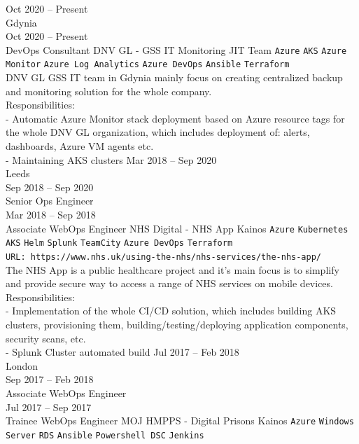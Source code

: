 \documentclass[9pt]{style/developercv}
\begin{document}
\begin{entrylist}
	\entry
    {Oct 2020 -- Present\\\footnotesize{Gdynia}
    \\Oct 2020 -- Present\\\footnotesize{DevOps Consultant}}
		{DNV GL - GSS IT Monitoring}
		{JIT Team}
		{
			\texttt{Azure}\slashsep
      \texttt{AKS}\slashsep
			\texttt{Azure Monitor}\slashsep
			\texttt{Azure Log Analytics}\slashsep
			\texttt{Azure DevOps}\slashsep
      \texttt{Ansible}\slashsep
      \texttt{Terraform}\\

      DNV GL GSS IT team in Gdynia mainly focus on creating centralized backup and monitoring solution for the whole company.\\
      Responsibilities:\\
      - Automatic Azure Monitor stack deployment based on Azure resource tags for the whole DNV GL organization, which includes deployment of: alerts, dashboards, Azure VM agents etc.\\
      - Maintaining AKS clusters
		}
	\entry
    {Mar 2018 -- Sep 2020\\\footnotesize{Leeds}
    \\Sep 2018 -- Sep 2020\\\footnotesize{Senior Ops Engineer}
    \\Mar 2018 -- Sep 2018\\\footnotesize{Associate WebOps Engineer}}
		{NHS Digital - NHS App}
		{Kainos}
		{
			\texttt{Azure}\slashsep
      \texttt{Kubernetes}\slashsep
      \texttt{AKS}\slashsep
			\texttt{Helm}\slashsep
			\texttt{Splunk}\slashsep
			\texttt{TeamCity}\slashsep
			\texttt{Azure DevOps}\slashsep
      \texttt{Terraform}\\
      \texttt{URL: https://www.nhs.uk/using-the-nhs/nhs-services/the-nhs-app/}\\

      The NHS App is a public healthcare project and it's main focus is to simplify and provide secure way to access a range of NHS services on mobile devices.\\
      Responsibilities:\\
      - Implementation of the whole CI/CD solution, which includes building AKS clusters, provisioning them, building/testing/deploying application components,
      security scans, etc.\\
      - Splunk Cluster automated build
		}
	\entry
    {Jul 2017 -- Feb 2018\\\footnotesize{London}
    \\Sep 2017 -- Feb 2018\\\footnotesize{Associate WebOps Engineer}
    \\Jul 2017 -- Sep 2017\\\footnotesize{Trainee WebOps Engineer}}
		{MOJ HMPPS - Digital Prisons}
		{Kainos}
		{
			\texttt{Azure}\slashsep
			\texttt{Windows Server}\slashsep
			\texttt{RDS}\slashsep
			\texttt{Ansible}\slashsep
			\texttt{Powershell DSC}\slashsep
      \texttt{Jenkins}\\

}
\end{entrylist}
\end{document}
